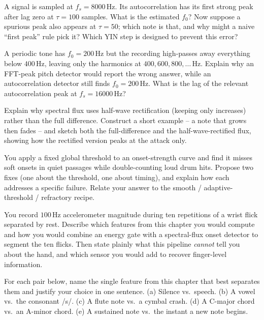 \begin{exercise}
\label{ch27:ex7}
A signal is sampled at $f_s = 8000$\,Hz. Its autocorrelation has its first strong
peak after lag zero at $\tau = 100$ samples. What is the estimated $f_0$? Now
suppose a spurious peak also appears at $\tau = 50$; which note is that, and why
might a naive ``first peak'' rule pick it? Which YIN step is designed to prevent
this error?
\end{exercise}

\begin{exercise}
\label{ch27:ex8}
A periodic tone has $f_0 = 200$\,Hz but the recording high-passes away everything
below $400$\,Hz, leaving only the harmonics at $400, 600, 800, \dots$\,Hz. Explain
why an FFT-peak pitch detector would report the wrong answer, while an
autocorrelation detector still finds $f_0 = 200$\,Hz. What is the lag of the
relevant autocorrelation peak at $f_s = 16000$\,Hz?
\end{exercise}

\begin{exercise}
\label{ch27:ex9}
Explain why spectral flux uses half-wave rectification (keeping only increases)
rather than the full difference. Construct a short example -- a note that grows then
fades -- and sketch both the full-difference and the half-wave-rectified flux,
showing how the rectified version peaks at the attack only.
\end{exercise}

\begin{exercise}
\label{ch27:ex10}
You apply a fixed global threshold to an onset-strength curve and find it misses
soft onsets in quiet passages while double-counting loud drum hits. Propose two
fixes (one about the threshold, one about timing), and explain how each addresses a
specific failure. Relate your answer to the smooth / adaptive-threshold /
refractory recipe.
\end{exercise}

\begin{exercise}
\label{ch27:ex11}
You record $100$\,Hz accelerometer magnitude during ten repetitions of a wrist
flick separated by rest. Describe which features from this chapter you would
compute and how you would combine an energy gate with a spectral-flux onset
detector to segment the ten flicks. Then state plainly what this pipeline
\emph{cannot} tell you about the hand, and which sensor you would add to recover
finger-level information.
\end{exercise}

\begin{exercise}
\label{ch27:ex12}
For each pair below, name the single feature from this chapter that best separates
them and justify your choice in one sentence. (a) Silence vs.\ speech. (b) A vowel vs.\ the
consonant /s/. (c) A flute note vs.\ a cymbal crash. (d) A C-major chord vs.\ an
A-minor chord. (e) A sustained note vs.\ the instant a new note begins.
\end{exercise}
